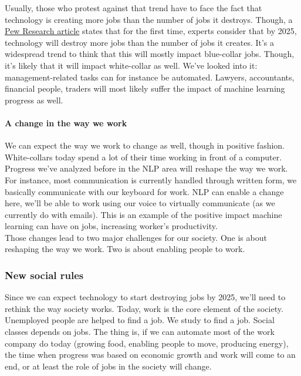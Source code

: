 \documentclass[12pt]{article}
\begin{document}
\smallskip

Usually, those who protest against that trend have to face the fact that
technology is creating more jobs than the number of jobs it destroys. Though, a
\href{http://www.pewinternet.org/2014/08/06/future-of-jobs/}{Pew Research article}
states that for the first time, experts consider that by 2025, technology will
destroy more jobs than the number of jobs it creates. It's a widespread trend to
think that this will mostly impact blue-collar jobs. Though, it's likely that it
will impact white-collar as well. We've looked into it: management-related tasks
can for instance be automated. Lawyers, accountants, financial people, traders will
most likely suffer the impact of machine learning progress as well.


\paragraph{A change in the way we work}

We can expect the way we work to change as well, though in positive fashion.
White-collars today spend a lot of their time working in front of a computer.
Progress we've analyzed before in the NLP area will reshape the way we work. For
instance, most communication is currently handled through written form, we
basically communicate with our keyboard for work. NLP can enable a change here,
we'll be able to work using our voice to virtually communicate (as we currently
do with emails). This is an example of the positive impact machine learning can
have on jobs, increasing worker's productivity.\\

Those changes lead to two major challenges for our society. One is about
reshaping the way we work. Two is about enabling people to work.

\subsubsection{New social rules}

Since we can expect technology to start destroying jobs by 2025, we'll need to
rethink the way society works. Today, work is the core element of the society.
Unemployed people are helped to find a job. We study to find a job. Social
classes depends on jobs.
The thing is, if we can automate most of the work company do today (growing food,
enabling people to move, producing energy), the time when progress was based on
economic growth and work will come to an end, or at least the role of jobs in
the society will change.\\
\end{document}
